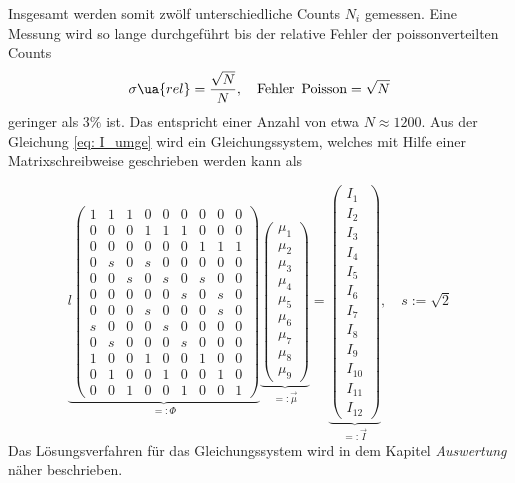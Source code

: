 Insgesamt werden somit zwölf unterschiedliche Counts $N_i$ gemessen.
Eine Messung wird so lange durchgeführt bis der relative Fehler der poissonverteilten Counts
\begin{equation*}
  \sigma\ua{rel}=\frac{\sqrt{N}}{N}, \quad \text{Fehler\, Poisson}= \sqrt{N}
\end{equation*}
geringer als $3\%$ ist. Das entspricht einer Anzahl von etwa $N\approx 1200$.
Aus der Gleichung \eqref{eq: I_umge} wird ein Gleichungssystem, welches mit Hilfe einer
Matrixschreibweise geschrieben werden kann als

\begin{equation}
  \label{eq: matrix_absoprtionskoeffizienten}
  \underbrace{ l\begin{pmatrix} 1 & 1 & 1 & 0 & 0 & 0 & 0 & 0 & 0 \\ 0 & 0 & 0 & 1 & 1 & 1 & 0 & 0 & 0 \\ 0 & 0 & 0 & 0 & 0 & 0 & 1 & 1 & 1 \\ 0 & s & 0 & s & 0 & 0 & 0 & 0 & 0 \\ 0 & 0 & s & 0 & s & 0 & s & 0 & 0 \\ 0 & 0 & 0 & 0 & 0 & s & 0 & s & 0 \\ 0 & 0 & 0 & s & 0 & 0 & 0 & s & 0 \\ s & 0 & 0 & 0 & s & 0 & 0 & 0 & 0 \\ 0 & s & 0 & 0 & 0 & s & 0 & 0 & 0 \\ 1 & 0 & 0 & 1 & 0 & 0 & 1 & 0 & 0 \\ 0 & 1 & 0 & 0 & 1 & 0 & 0 & 1 & 0 \\ 0 & 0 & 1 & 0 & 0 & 1 & 0 & 0 & 1 \end{pmatrix} }_{=:\Phi}  \underbrace{ \begin{pmatrix}\mu_1 \\ \mu_2 \\ \mu_3 \\ \mu_4 \\ \mu_5 \\ \mu_6 \\ \mu_7 \\ \mu_8 \\ \mu_9 \end{pmatrix} }_{=:\vec{\mu}} = \underbrace{ \begin{pmatrix} I_1 \\ I_2 \\ I_3 \\ I_4 \\ I_5 \\ I_6 \\ I_7 \\ I_8 \\ I_9 \\ I_{10} \\ I_{11} \\ I_{12} \end{pmatrix} }_{ =:\vec{I}}, \quad s:=\sqrt{2}
\end{equation}
Das Lösungsverfahren für das Gleichungssystem wird in dem Kapitel \emph{Auswertung} näher beschrieben.

